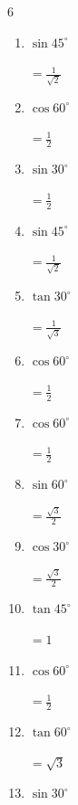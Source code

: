 \begin{multicols}{6}
\begin{enumerate}
        $\displaystyle =\frac{1}{\sqrt{2}}$

  \item $\displaystyle \sin{45^\circ}$

        $\displaystyle =\frac{1}{\sqrt{2}}$

  \item $\displaystyle \cos{60^\circ}$

        $\displaystyle =\frac{1}{2}$

  \item $\displaystyle \sin{30^\circ}$

        $\displaystyle =\frac{1}{2}$

  \item $\displaystyle \sin{45^\circ}$

        $\displaystyle =\frac{1}{\sqrt{2}}$

\columnbreak %

  \item $\displaystyle \tan{30^\circ}$

        $\displaystyle =\frac{1}{\sqrt{3}}$

  \item $\displaystyle \cos{60^\circ}$

        $\displaystyle =\frac{1}{2}$

  \item $\displaystyle \cos{60^\circ}$

        $\displaystyle =\frac{1}{2}$

  \item $\displaystyle \sin{60^\circ}$

        $\displaystyle =\frac{\sqrt{3}}{2}$

  \item $\displaystyle \cos{30^\circ}$

        $\displaystyle =\frac{\sqrt{3}}{2}$

  \item $\displaystyle \tan{45^\circ}$

        $\displaystyle =1$

  \item $\displaystyle \cos{60^\circ}$

        $\displaystyle =\frac{1}{2}$

  \item $\displaystyle \tan{60^\circ}$

        $\displaystyle =\sqrt{3}$

  \item $\displaystyle \sin{30^\circ}$


\end{enumerate}
\end{multicols}
